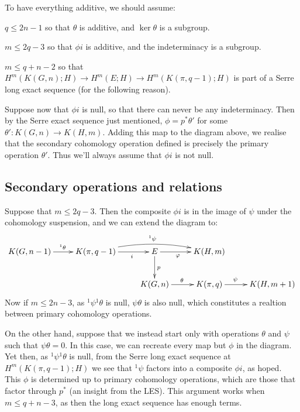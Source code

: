 \documentclass[11pt]{article}
\begin{document}
To have everything additive, we should assume:
\begin{itemise}
\item $q\leq 2n-1$ so that $\theta$ is additive, and $\ker\theta$ is a subgroup.
\item $m\leq 2q-3$ so that $\phi i$ is additive, and the indeterminacy is a
subgroup.
\item $m\leq q+n-2$ so that $H^m(K(G,n);H)\to H^m(E;H)\to H^m(K(\pi,q-1);H)$ is
part of a Serre long exact sequence (for the following reason).
\end{itemise}
Suppose now that $\phi i$ is null, so that there can never be any indeterminacy.
Then by the Serre exact sequence just mentioned, $\phi=p^*\theta'$ for some
$\theta':K(G,n)\to K(H,m)$. Adding this map to the diagram above, we realise
that the secondary cohomology operation defined is precisely the primary
operation $\theta'$. Thus we'll always assume that $\phi i$ is not null.
\subsection{Secondary operations and relations}
Suppose that $m\leq 2q-3$. Then the composite $\phi i$ is in the image of $\psi$
under the cohomology suspension, and we can extend the diagram to:
\[\xymatrix{
K(G,n-1)\ar[r]^{^1\theta}&
K(\pi,q-1)\ar[r]_{\ \ \ \ \ i}\ar@/^.8pc/[rr]^{^1\psi}&
E\ar[r]_{\phi\ \ \ }\ar[d]^p&K(H,m)\\
&&%
K(G,n)\ar[r]^\theta&K(\pi,q)\ar[r]^{\psi\ \ \ \ }&
K(H,m+1)
}\]
Now if $m\leq 2n-3$, as ${^1\psi}{^1\theta}$ is null, $\psi\theta$ is also null,
which constitutes a realtion between primary cohomology operations.

On the other hand, suppose that we instead start only with operations $\theta$
and $\psi$ such that $\psi\theta=0$. In this case, we can recreate every map but
$\phi$ in the diagram. Yet then, as ${^1\psi}{^1\theta}$ is null, from the Serre
long exact sequence at $H^m(K(\pi,q-1);H)$ we see that ${^1\psi}$ factors into a
composite $\phi i$, as hoped. This $\phi$ is determined up to primary cohomology
operations, which are those that factor through $p^*$ (an insight from the LES).
This argument works when $m\leq q+n-3$, as then the long exact sequence has
enough terms.
\end{document}
